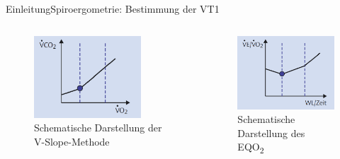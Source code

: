 \documentclass[
handout, 
aspectratio=141, 
10pt,
xcolor=dvipsnames]
{beamer}
\begin{document}
\begin{frame}{Einleitung}{Spiroergometrie: Bestimmung der VT1}
\begin{columns}
	\begin{column}{5cm}
		\begin{figure}[H]
			\begin{center}
			\includegraphics[width=40mm]{Bilder/vslope.png}
			\caption{Schematische Darstellung der V-Slope-Methode}
			\end{center}
		\end{figure}
	\end{column}
	\begin{column}{5cm}
		\begin{figure}[H]
			\begin{center}
			\includegraphics[width=40mm]{Bilder/eqo2.png}
			\caption{Schematische Darstellung des EQO\textsubscript{2}}
			\end{center}
		\end{figure}
	\end{column}
\end{columns}
\end{frame}
	
\end{document}

